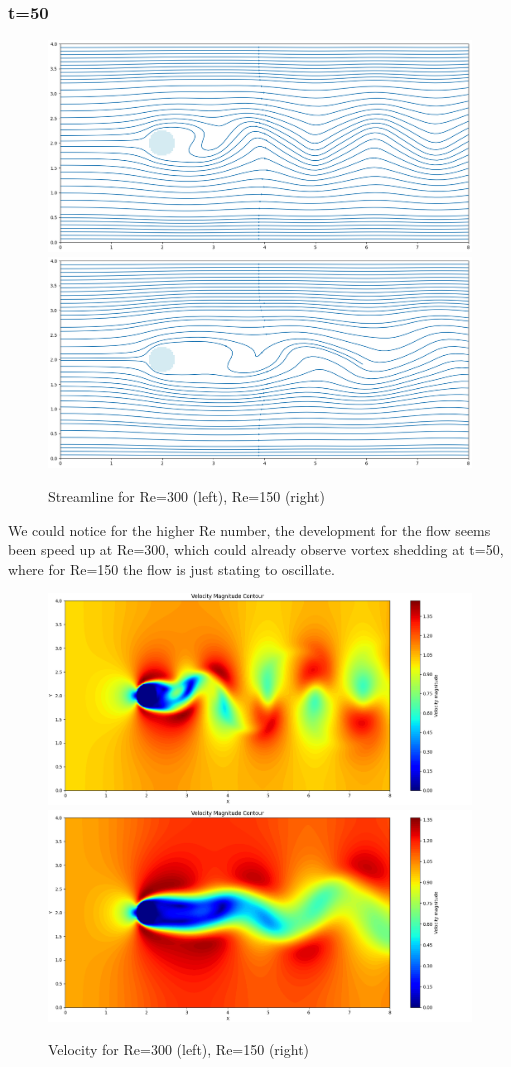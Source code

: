 \documentclass[12pt]{article}
\begin{document}
\subsubsection{t=50}
\begin{figure}[H]
    \centering
    \includegraphics[width=0.45\linewidth]{figure/N32_Re300_8x4_t50/stline_N32_Re300_8x4_t50.jpg}
    \includegraphics[width=0.45\linewidth]{figure/N32_Re150_8x4_t50/stline_N32_Re150_8x4_t50.jpg}
    \caption{Streamline for Re=300 (left), Re=150 (right)}
\end{figure}

We could notice for the higher Re number, the development for the flow seems been speed up at Re=300, which could already observe vortex shedding at t=50, where for Re=150 the flow is just stating to oscillate.

\begin{figure}[H]
    \centering
    \includegraphics[width=0.45\linewidth]{figure/N32_Re300_8x4_t50/v_N32_Re300_8x4_t50.jpg}
    \includegraphics[width=0.45\linewidth]{figure/N32_Re150_8x4_t50/v_N32_Re150_8x4_t50.jpg}
    \caption{Velocity for Re=300 (left), Re=150 (right) }
\end{figure}
\end{document}
